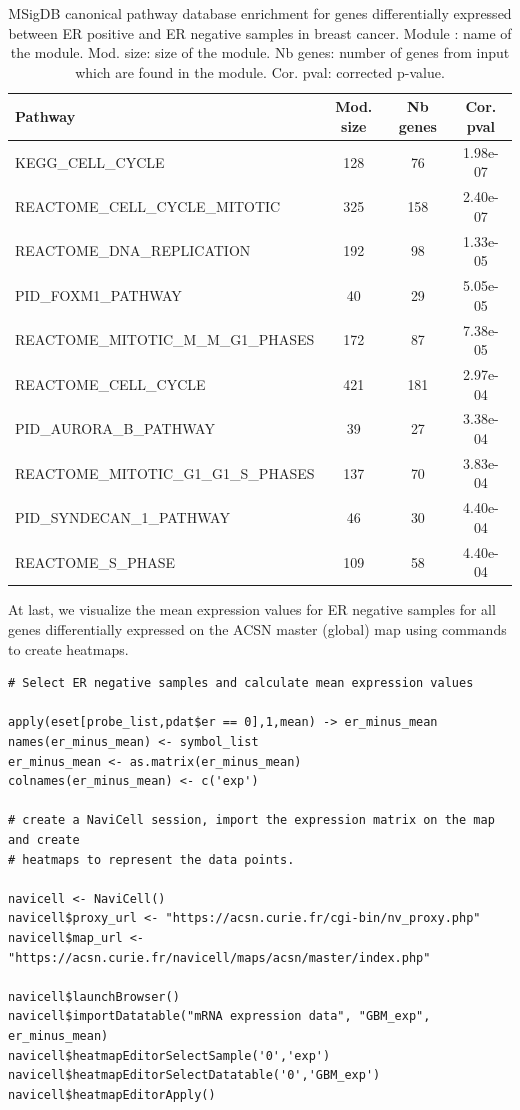 \documentclass[article]{jss}
\begin{document}
\begin{table}[h!]
  \centering
  \caption{MSigDB canonical pathway database enrichment for genes differentially expressed between ER
positive and ER negative samples in breast cancer.  Module : name of the
module. Mod. size: size of the module. Nb genes: number of genes from input
which are found in the module. Cor. pval: corrected p-value.}
\label{tab:table_msigdb}

\begin{tabular}{l|c|c|c}
\hline
Pathway & Mod. size & Nb genes & Cor. pval\\
\hline
KEGG\_CELL\_CYCLE & 128 & 76 & 1.98e-07\\
REACTOME\_CELL\_CYCLE\_MITOTIC & 325 & 158 & 2.40e-07\\
REACTOME\_DNA\_REPLICATION & 192 & 98 & 1.33e-05\\
PID\_FOXM1\_PATHWAY & 40 & 29 & 5.05e-05\\
REACTOME\_MITOTIC\_M\_M\_G1\_PHASES & 172 & 87 & 7.38e-05\\
REACTOME\_CELL\_CYCLE & 421 & 181 & 2.97e-04\\
PID\_AURORA\_B\_PATHWAY & 39 & 27 & 3.38e-04\\
REACTOME\_MITOTIC\_G1\_G1\_S\_PHASES & 137 & 70 & 3.83e-04\\ 
PID\_SYNDECAN\_1\_PATHWAY & 46 & 30 & 4.40e-04\\
REACTOME\_S\_PHASE & 109 & 58 & 4.40e-04\\
\hline
\end{tabular}
\end{table}

At last, we visualize the mean expression values for ER negative samples for all
genes differentially expressed on the ACSN master (global) map using 
commands to create heatmaps.

\begin{verbatim}
# Select ER negative samples and calculate mean expression values

apply(eset[probe_list,pdat$er == 0],1,mean) -> er_minus_mean
names(er_minus_mean) <- symbol_list
er_minus_mean <- as.matrix(er_minus_mean)
colnames(er_minus_mean) <- c('exp')

# create a NaviCell session, import the expression matrix on the map and create
# heatmaps to represent the data points.

navicell <- NaviCell()
navicell$proxy_url <- "https://acsn.curie.fr/cgi-bin/nv_proxy.php"
navicell$map_url <- "https://acsn.curie.fr/navicell/maps/acsn/master/index.php"

navicell$launchBrowser()
navicell$importDatatable("mRNA expression data", "GBM_exp", er_minus_mean)
navicell$heatmapEditorSelectSample('0','exp')
navicell$heatmapEditorSelectDatatable('0','GBM_exp')
navicell$heatmapEditorApply()
\end{verbatim}
\end{document}
